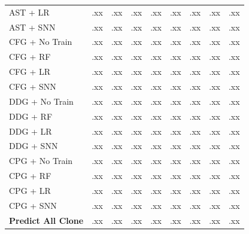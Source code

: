\documentclass[final,5p,times,twocolumn]{elsarticle}
\theoremstyle{plain}
\begin{document}
\begin{table}[!htbp]
\begin{tabular}{@{}lcccccccc@{}}
AST + LR
& .xx & .xx & .xx & .xx
& .xx & .xx & .xx & .xx \\

AST + SNN
& .xx & .xx & .xx & .xx
& .xx & .xx & .xx & .xx \\

\midrule

CFG + No Train
& .xx & .xx & .xx & .xx
& .xx & .xx & .xx & .xx \\

CFG + RF
& .xx & .xx & .xx & .xx
& .xx & .xx & .xx & .xx \\

CFG + LR
& .xx & .xx & .xx & .xx
& .xx & .xx & .xx & .xx \\

CFG + SNN
& .xx & .xx & .xx & .xx
& .xx & .xx & .xx & .xx \\

\midrule

DDG + No Train
& .xx & .xx & .xx & .xx
& .xx & .xx & .xx & .xx \\

DDG + RF
& .xx & .xx & .xx & .xx
& .xx & .xx & .xx & .xx \\

DDG + LR
& .xx & .xx & .xx & .xx
& .xx & .xx & .xx & .xx \\

DDG + SNN
& .xx & .xx & .xx & .xx
& .xx & .xx & .xx & .xx \\

\midrule

CPG + No Train
& .xx & .xx & .xx & .xx
& .xx & .xx & .xx & .xx \\

CPG + RF
& .xx & .xx & .xx & .xx
& .xx & .xx & .xx & .xx \\

CPG + LR
& .xx & .xx & .xx & .xx
& .xx & .xx & .xx & .xx \\

CPG + SNN
& .xx & .xx & .xx & .xx
& .xx & .xx & .xx & .xx \\

\midrule

\textbf{Predict All Clone}
& .xx & .xx & .xx & .xx
& .xx & .xx & .xx & .xx \\

\bottomrule
\end{tabular}
\end{table}
\end{document}
